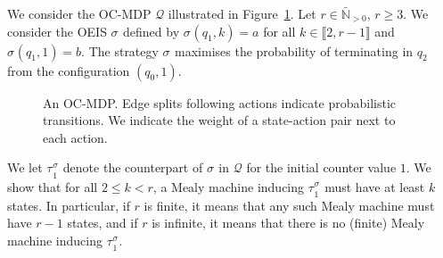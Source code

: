 \documentclass[a4paper,UKenglish,cleveref,autoref,thm-restate,colorlinks]{lipics-v2021}
\newcommand{\integerInterval}[1]{\llbracket{}#1\rrbracket{}}
\newcommand{\IN}{\mathbb{N}}
\newcommand{\INposBar}{\bar{\IN}_{>0}}
\newcommand{\ocmdp}{\mathcal{Q}}
\newcommand{\ocState}{q}
\newcommand{\ocCount}{k}
\newcommand{\ocAction}{a}
\newcommand{\ocActionB}{b}
\newcommand{\counterUB}{r}
\newcommand{\stratGeneric}[1]{{\sigma_{#1}}}
\newcommand{\strat}{\stratGeneric{}}
\newcommand{\stratBGeneric}[1]{{\tau_{#1}}}
\newcommand{\stratB}{\stratBGeneric{}}
\begin{document}
\begin{example}\label{example:interval vs memory}
  We consider the OC-MDP $\ocmdp$ illustrated in Figure~\ref{figure:ocmdp:memory}.
  Let $\counterUB\in\INposBar$, $\counterUB \geq 3$.
  We consider the OEIS $\strat$ defined by $\strat(\ocState_1, \ocCount) = \ocAction$ for all $\ocCount\in\integerInterval{2, \counterUB-1}$ and $\strat(\ocState_1, 1) = \ocActionB$.
  The strategy $\strat$ maximises the probability of terminating in $\ocState_2$ from the configuration $(\ocState_0, 1)$.
  \begin{figure}
    \centering
    \caption{An OC-MDP.
      Edge splits following actions indicate probabilistic transitions.
      We indicate the weight of a state-action pair next to each action.
    }\label{figure:ocmdp:memory}
  \end{figure}

  We let $\stratB^{\strat}_1$ denote the counterpart of $\strat$ in $\ocmdp$ for the initial counter value $1$.
  We show that for all $2\leq\ocCount<\counterUB$, a Mealy machine inducing $\stratB^{\strat}_1$ must have at least $\ocCount$ states.
  In particular, if $\counterUB$ is finite, it means that any such Mealy machine must have $\counterUB-1$ states, and if $\counterUB$ is infinite, it means that there is no (finite) Mealy machine inducing $\stratB^\strat_1$.
  

\end{example}
\end{document}
